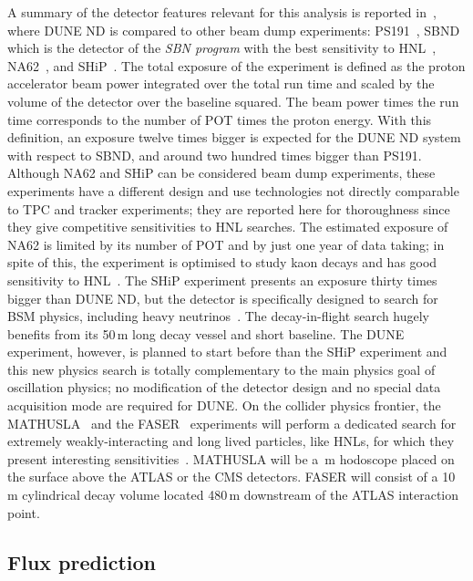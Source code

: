A summary of the detector features relevant for this analysis is reported in~, %
where DUNE ND is compared to other beam dump experiments: %
PS191~\cite{Bernardi:1985ny,Bernardi:1987ek}, SBND which is the detector of the \emph{SBN program} with the best sensitivity to %
HNL~\cite{Ballett:2016opr}, NA62~\cite{NA62:2017rwk}, and SHiP~\cite{Anelli:2015pba}.
The total exposure of the experiment is defined as the proton accelerator beam power integrated over the total run time %
and scaled by the volume of the detector over the baseline squared.
The beam power times the run time corresponds to the number of POT times the proton energy. 
With this definition, an exposure twelve times bigger is expected for the DUNE ND system with respect to SBND, %
and around two hundred times bigger than PS191.
Although NA62 and SHiP can be considered beam dump experiments, these experiments have a different design %
and use technologies not directly comparable to TPC and tracker experiments; %
they are reported here for thoroughness since they give competitive sensitivities to HNL searches.
The estimated exposure of NA62 is limited by its number of POT and by just one year of data taking; %
in spite of this, the experiment is optimised to study kaon decays and has good %
sensitivity to HNL~\cite{Drewes:2018irr}.
The SHiP experiment presents an exposure thirty times bigger than DUNE ND, but the detector is specifically %
designed to search for BSM physics, including heavy neutrinos~\cite{SHiP:2018xqw,Caputo:2016ojx}.
The decay-in-flight search hugely benefits from its 50\,m long decay vessel and short baseline.
The DUNE experiment, however, is planned to start before than the SHiP experiment and %
this new physics search is totally complementary to the main physics goal of oscillation physics; %
no modification of the detector design and no special data acquisition mode are required for DUNE.
On the collider physics frontier, the MATHUSLA~\cite{Curtin:2018mvb} and the FASER~\cite{Ariga:2018uku} experiments %
will perform a dedicated search for extremely weakly-interacting and long lived particles, %
like HNLs, for which they present interesting sensitivities~\cite{Curtin:2018mvb, Kling:2018wct}.
MATHUSLA will be a \,m hodoscope placed on the surface above the ATLAS or the CMS detectors.
FASER will consist of a 10\,m cylindrical decay volume located 480\,m downstream of the ATLAS interaction point. 

\subsection{Flux prediction}
\label{sec:tauneutrino}

